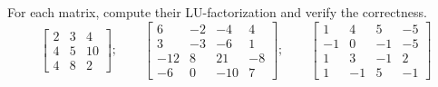\begin{exercise}\label{ex:2.6}

	For each matrix, compute their LU-factorization and verify the correctness.
	\[
		\begin{bmatrix}
			2 & 3 & 4  \\
			4 & 5 & 10 \\
			4 & 8 & 2
		\end{bmatrix};
		\qquad
		\begin{bmatrix}
			6   & -2 & -4  & 4  \\
			3   & -3 & -6  & 1  \\
			-12 & 8  & 21  & -8 \\
			-6  & 0  & -10 & 7
		\end{bmatrix};
		\qquad
		\begin{bmatrix}
			1  & 4  & 5  & -5 \\
			-1 & 0  & -1 & -5 \\
			1  & 3  & -1 & 2  \\
			1  & -1 & 5  & -1
		\end{bmatrix}
	\]
\end{exercise}

